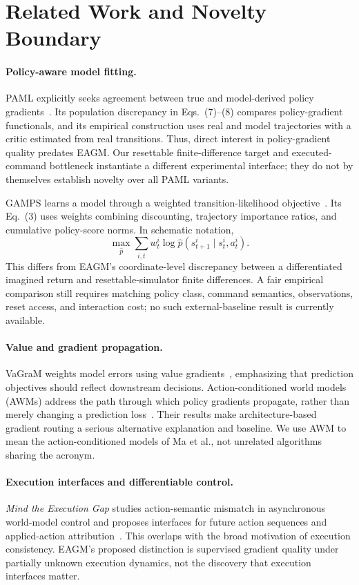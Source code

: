 \section{Related Work and Novelty Boundary}
\paragraph{Policy-aware model fitting.}
PAML explicitly seeks agreement between true and model-derived policy gradients~\cite{paml}. Its population discrepancy in Eqs.~(7)--(8) compares policy-gradient functionals, and its empirical construction uses real and model trajectories with a critic estimated from real transitions. Thus, direct interest in policy-gradient quality predates EAGM. Our resettable finite-difference target and executed-command bottleneck instantiate a different experimental interface; they do not by themselves establish novelty over all PAML variants.

GAMPS learns a model through a weighted transition-likelihood objective~\cite{gamps}. Its Eq.~(3) uses weights combining discounting, trajectory importance ratios, and cumulative policy-score norms. In schematic notation,
\begin{equation}
 \max_{\hat p}\sum_{i,t}w^i_t\log\hat p(s^i_{t+1}\mid s^i_t,a^i_t).
\end{equation}
This differs from EAGM's coordinate-level discrepancy between a differentiated imagined return and resettable-simulator finite differences. A fair empirical comparison still requires matching policy class, command semantics, observations, reset access, and interaction cost; no such external-baseline result is currently available.

\paragraph{Value and gradient propagation.}
VaGraM weights model errors using value gradients~\cite{vagram}, emphasizing that prediction objectives should reflect downstream decisions. Action-conditioned world models (AWMs) address the path through which policy gradients propagate, rather than merely changing a prediction loss~\cite{awm}. Their results make architecture-based gradient routing a serious alternative explanation and baseline. We use AWM to mean the action-conditioned models of Ma et al., not unrelated algorithms sharing the acronym.

\paragraph{Execution interfaces and differentiable control.}
\emph{Mind the Execution Gap} studies action-semantic mismatch in asynchronous world-model control and proposes interfaces for future action sequences and applied-action attribution~\cite{executiongap}. This overlaps with the broad motivation of execution consistency. EAGM's proposed distinction is supervised gradient quality under partially unknown execution dynamics, not the discovery that execution interfaces matter.

